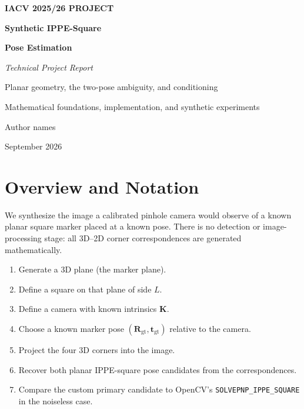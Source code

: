 \documentclass[11pt,a4paper]{article}
\theoremstyle{definition}
\theoremstyle{plain}
\theoremstyle{remark}
\newcommand{\flag}{\texttt{SOLVEPNP\allowbreak\_IPPE\allowbreak\_SQUARE}}
\newcommand{\Rgt}{\mathbf{R}_{\text{gt}}}
\newcommand{\tgt}{\mathbf{t}_{\text{gt}}}
\newcommand{\KK}{\mathbf{K}}
\begin{document}
\begin{titlepage}
\centering
\vspace*{3cm}
{\color{accent2}\bfseries\large IACV 2025/26 PROJECT}\par
\vspace{0.6cm}
{\color{accent}\bfseries\Huge Synthetic IPPE-Square}\par
\vspace{0.3cm}
{\color{accent}\bfseries\Huge Pose Estimation}\par
\vspace{0.8cm}
{\color{greytext}\itshape\Large Technical Project Report}\par
\vspace{0.5cm}
{\color{greytext}\large Planar geometry, the two-pose ambiguity, and conditioning}\par
\vspace{0.4cm}
{\color{greytext} Mathematical foundations, implementation, and synthetic experiments}
\vfill
{\color{greytext}\large Author names\par}
\vfill
{\color{greytext} September 2026}
\end{titlepage}

\tableofcontents
\thispagestyle{empty}
\clearpage

\section{Overview and Notation}
\label{sec:overview}

We synthesize the image a calibrated pinhole camera would observe of a
known planar square marker placed at a known pose. There is no detection or
image-processing stage: all 3D--2D corner correspondences are generated
mathematically.

\begin{enumerate}[label=\textbf{Step \arabic*.}, leftmargin=*]
  \item Generate a 3D plane (the marker plane).
  \item Define a square on that plane of side $L$.
  \item Define a camera with known intrinsics $\KK$.
  \item Choose a known marker pose $(\Rgt, \tgt)$ relative to the camera.
  \item Project the four 3D corners into the image.
  \item Recover both planar IPPE-square pose candidates from the correspondences.
  \item Compare the custom primary candidate to OpenCV's
        \flag{} in the noiseless case.
\end{enumerate}
\end{document}
